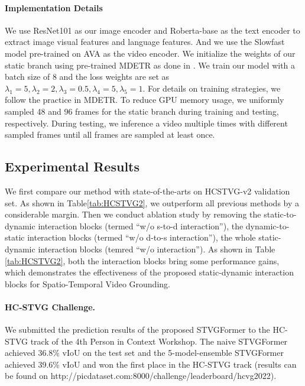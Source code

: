 \documentclass[sigconf]{acmart}
\begin{document}
\paragraph{Implementation Details}
We use ResNet101\cite{resnet} as our image encoder and Roberta-base\cite{roberta} as the text encoder to extract image visual features and language features. And we use the Slowfast\cite{slowfast} model pre-trained on AVA\cite{ava} as the video encoder. We initialize the weights of our static branch using pre-trained MDETR\cite{mdetr} as done in \cite{Aug2dTAN, TubeDETR}. We train our model with a batch size of 8 and the loss weights are set as $\lambda_1=5,\lambda_2=2, \lambda_3=0.5, \lambda_4=5, \lambda_5=1$. For details on training strategies, we follow the practice in MDETR\cite{mdetr}. To reduce GPU memory usage, we uniformly sampled 48 and 96 frames for the static branch during training and testing, respectively. During testing, we inference a video multiple times with different sampled frames until all frames are sampled at least once.

\subsection{Experimental Results}
We first compare our method with state-of-the-arts on HCSTVG-v2 validation set\cite{HCSTVG_paper}. As shown in Table\ref{tab:HCSTVG2}, we outperform all previous methods by a considerable margin. Then we conduct ablation study by removing the static-to-dynamic interaction blocks (termed ``w/o s-to-d interaction''), the dynamic-to-static interaction blocks (termed ``w/o d-to-s interaction''), the whole static-dynamic interaction blocks (temred ``w/o interaction''). As shown in Table \ref{tab:HCSTVG2}, both the interaction blocks bring some performance gains, which demonstrates the effectiveness of the proposed static-dynamic interaction blocks for Spatio-Temporal Video Grounding.
\paragraph{HC-STVG Challenge.}
We submitted the prediction results of the proposed STVGFormer to the HC-STVG track of the 4th Person in Context Workshop. The naive STVGFormer achieved 36.8\% vIoU on the test set and the 5-model-ensemble STVGFormer achieved 39.6\% vIoU and won the first place in the HC-STVG track (results can be found on http://picdataset.com:8000/challenge/leaderboard/hcvg2022).
\end{document}
